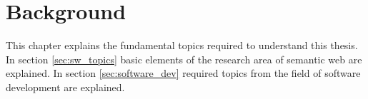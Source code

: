 \chapter{Background}
\label{ch:background}

This chapter explains the fundamental topics required to understand this thesis.
\\

In section \ref{sec:sw_topics} basic elements of the research area of semantic web are explained.
In section \ref{sec:software_dev} required topics from the field of software development are explained.




